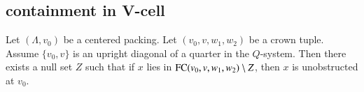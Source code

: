 \subsection{containment in V-cell}

%
%
%
%
%




\begin{lemma}
Let $(\Lambda,v_0)$ be a centered packing.  Let $(v_0,v,w_1,w_2)$
be a crown tuple.
Assume $\{v_0,v\}$ is an upright diagonal of a quarter in the
$Q$-system.   
Then there exists a null set $Z$ such that if $x$ lies in %
${\operatorname{FC}}(v_0,v,w_1,w_2)\setminus Z$,
then $x$ is unobstructed at $v_0$.
\end{lemma}


